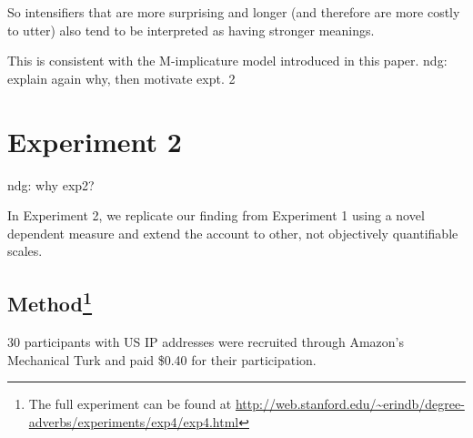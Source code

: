 \documentclass[10pt,letterpaper]{article}
\newcommand{\todo}[1]{{\color{red}#1}}
\begin{document}
So intensifiers that are more surprising and longer (and therefore are more costly to utter) also tend to be interpreted as having stronger meanings.

This is consistent with the M-implicature model introduced in this paper.
\todo{ndg: explain again why, then motivate expt. 2}


\section{Experiment 2}



\todo{ndg: why exp2?}


In Experiment 2, we replicate our finding from Experiment 1 using a novel dependent measure and extend the account to other, not objectively quantifiable scales.

\subsection{Method\footnote{The full experiment can be found at \url{http://web.stanford.edu/~erindb/degree-adverbs/experiments/exp4/exp4.html}}}

30 participants with US IP addresses were recruited through Amazon's Mechanical Turk and paid \$0.40 for their participation.
\end{document}

